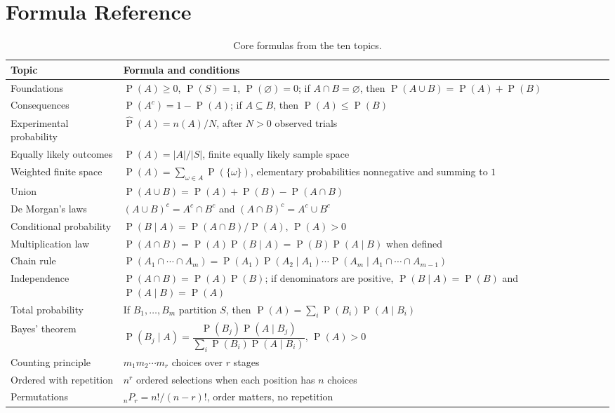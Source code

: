 \documentclass[11pt]{article}
\newcommand{\Pp}{\operatorname{P}}
\begin{document}
\section{Formula Reference}\label{sec:formulas}
\begin{table}[ht]
\centering
\caption{Core formulas from the ten topics.}\label{tab:formulas}
\small
\begin{tabularx}{\textwidth}{@{}lY@{}}
\toprule
Topic & Formula and conditions \\
\midrule
Foundations & $\Pp(A)\ge0$, $\Pp(S)=1$, $\Pp(\varnothing)=0$; if $A\cap B=\varnothing$, then $\Pp(A\cup B)=\Pp(A)+\Pp(B)$ \\
Consequences & $\Pp(A^c)=1-\Pp(A)$; if $A\subseteq B$, then $\Pp(A)\le\Pp(B)$ \\
Experimental probability & $\widehat{\Pp}(A)=n(A)/N$, after $N>0$ observed trials \\
Equally likely outcomes & $\Pp(A)=|A|/|S|$, finite equally likely sample space \\
Weighted finite space & $\Pp(A)=\sum_{\omega\in A}\Pp(\{\omega\})$, elementary probabilities nonnegative and summing to $1$ \\
Union & $\Pp(A\cup B)=\Pp(A)+\Pp(B)-\Pp(A\cap B)$ \\
De Morgan's laws & $(A\cup B)^c=A^c\cap B^c$ and $(A\cap B)^c=A^c\cup B^c$ \\
Conditional probability & $\Pp(B\mid A)=\Pp(A\cap B)/\Pp(A)$, $\Pp(A)>0$ \\
Multiplication law & $\Pp(A\cap B)=\Pp(A)\Pp(B\mid A)=\Pp(B)\Pp(A\mid B)$ when defined \\
Chain rule & $\Pp(A_1\cap\cdots\cap A_m)=\Pp(A_1)\Pp(A_2\mid A_1)\cdots\Pp(A_m\mid A_1\cap\cdots\cap A_{m-1})$ \\
Independence & $\Pp(A\cap B)=\Pp(A)\Pp(B)$; if denominators are positive, $\Pp(B\mid A)=\Pp(B)$ and $\Pp(A\mid B)=\Pp(A)$ \\
Total probability & If $B_1,\ldots,B_m$ partition $S$, then $\Pp(A)=\sum_i\Pp(B_i)\Pp(A\mid B_i)$ \\
Bayes' theorem & $\Pp(B_j\mid A)=\dfrac{\Pp(B_j)\Pp(A\mid B_j)}{\sum_i\Pp(B_i)\Pp(A\mid B_i)}$, $\Pp(A)>0$ \\
Counting principle & $m_1m_2\cdots m_r$ choices over $r$ stages \\
Ordered with repetition & $n^r$ ordered selections when each position has $n$ choices \\
Permutations & ${}_nP_r=n!/(n-r)!$, order matters, no repetition \\

\end{tabularx}
\end{table}
\end{document}
